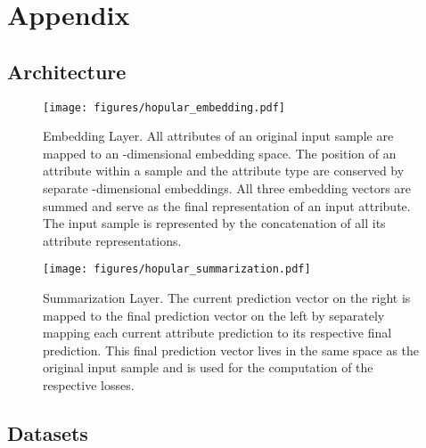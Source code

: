 \documentclass{article}
\theoremstyle{plain}
\theoremstyle{definition}
\theoremstyle{remark}
\begin{document}



\newpage{}
\appendix

\section{Appendix}
\renewcommand\thefigure{\thesection.\arabic{figure}}
\renewcommand\thetable{\thesection.\arabic{table}}

\subsection{Architecture} \label{sec:architecture_appendix}

\begin{figure}[h]
    \centering
    \texttt{[image: figures/hopular\_embedding.pdf]}
    \caption{Embedding Layer. All attributes of an original input sample
    are mapped to an -dimensional embedding space. The position of an
    attribute within a sample and the attribute type are conserved by separate -dimensional embeddings. All
    three embedding vectors are summed and serve as the final
    representation of an input attribute. The input sample is represented
    by the concatenation of all its attribute representations.}
    \label{fig:hopular_embedding}
\end{figure}

\begin{figure}[h]
    \centering
    \texttt{[image: figures/hopular\_summarization.pdf]}
    \caption{Summarization Layer. The current prediction vector on the right is mapped to the final prediction vector on the left by separately mapping each current attribute
    prediction to its respective final prediction. This final prediction vector lives
    in the same space as the original input sample and is used for the 
    computation of the respective losses.}
    \label{fig:hopular_summarization}
\end{figure}

\subsection{Datasets} \label{sec:dataset_explanation}
\end{document}
